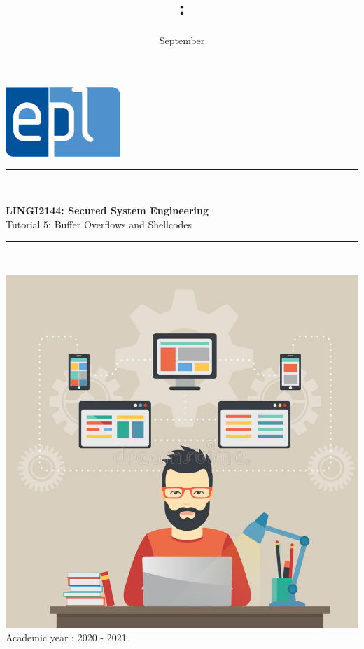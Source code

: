 \documentclass{article}
\title{\codecourse : \titlecourse}
\author{\othor}
\date{September \year}
\newcommand{\codecourse}{LINGI2144}
\newcommand{\titlecourse}{Secured System Engineering}
\newcommand{\ayear}{2020 - 2021}
\begin{document}
        \hfill\includegraphics[scale=0.5]{image/logoepl.png}
        
        \vspace*{\fill}
            
        \begin{center}
        
            \rule{1\textwidth}{1pt}\\
	            \vspace{0.5\baselineskip}
		            \begin{LARGE}
	                	\textbf{\codecourse : \titlecourse}\\
	                	Tutorial 5: Buffer Overflows and Shellcodes
		            \end{LARGE}
		        \vspace{0.5\baselineskip}       
	        \rule{1\textwidth}{1pt}\\
	        
	        \vspace{0.5\baselineskip}
	        
	        \includegraphics[scale=1.5]{image/MCP.jpg}\\

	        \vspace{0.5\baselineskip}
	            Academic year : \ayear\\
                
		\end{center}
		
\end{document}
